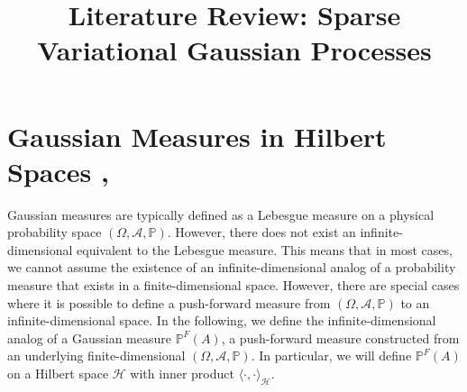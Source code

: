 \documentclass[twoside,11pt]{article}
\begin{document}
\title{Literature Review: Sparse Variational Gaussian Processes}
\maketitle

\section{Gaussian Measures in Hilbert Spaces \cite{wild2022generalized}, \cite{Kukush_2019}}
Gaussian measures are typically defined as a Lebesgue measure on a physical probability space $(\Omega, \mathcal{A}, \mathbb{P})$. However, there does not exist an infinite-dimensional equivalent to the Lebesgue measure. This means that in most cases, we cannot assume the existence of an infinite-dimensional analog of a probability measure that exists in a finite-dimensional space. However, there are special cases where it is possible to define a push-forward measure from $(\Omega, \mathcal{A}, \mathbb{P})$ to an infinite-dimensional space. In the following, we define the infinite-dimensional analog of a Gaussian measure  $\mathbb{P}^{F}(A)$, a push-forward measure constructed from an underlying finite-dimensional $(\Omega, \mathcal{A}, \mathbb{P})$. In particular, we will define $\mathbb{P}^{F}(A)$ on a Hilbert space $\mathcal{H}$ with inner product $\langle \cdot, \cdot \rangle_\mathcal{H}$.
\end{document}

